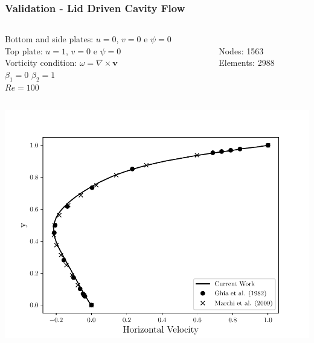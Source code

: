 \begin{frame}
 \frametitle{\LARGE Validation - Lid Driven Cavity Flow}
\vspace{-1.0cm}
\begin{center}
\begin{columns}[c]
\begin{column}{0.65\textwidth} 
\small
Bottom and side plates: $u=0$, $v=0$ e $\psi=0$\\[0.1cm]
Top plate: $u=1$, $v=0$ e $\psi=0$\\[0.1cm]
Vorticity condition: $\omega = \nabla \times \textbf{v}$\\[0.1cm]
$\beta_{1} = 0$ \qquad $\beta_{2} = 1$\\[0.1cm] 
$Re = 100$
\end{column}
\begin{column}{0.25\textwidth} 
\\
\small Nodes: 1563\\
\small Elements: 2988\\
\end{column}
\end{columns}
\end{center}

\vspace{-0.5cm}
\begin{center}
\begin{columns}[c]
\begin{column}{0.55\textwidth} 
      \includegraphics[scale=0.41]{./images/Re_100_u_profile.pdf}\\
\end{column}


\end{columns}
\end{center}
\end{frame}

